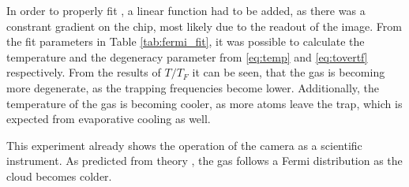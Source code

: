 In order to properly fit , a linear function had to be added, as there was a constrant gradient on the chip, most likely due to the readout of the image. From the fit parameters in Table \ref{tab:fermi_fit}, it was possible to calculate the temperature and the degeneracy parameter from \ref{eq:temp} and \ref{eq:tovertf} respectively. From the results of $T/T_F$ it can be seen, that the gas is becoming more degenerate, as the trapping frequencies become lower. Additionally, the temperature of the gas is becoming cooler, as more atoms leave the trap, which is expected from evaporative cooling as well.

This experiment already shows the operation of the camera as a scientific instrument. As predicted from theory \cite{Ketterle2008}, the gas follows a Fermi distribution as the cloud becomes colder.